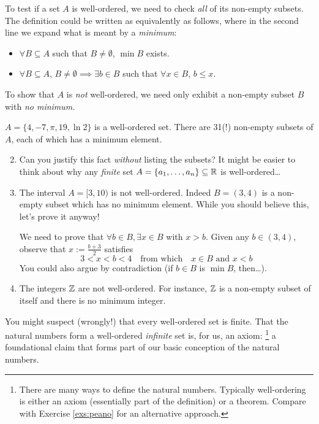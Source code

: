 To test if a set $A$ is well-ordered, we need to check \emph{all} of its non-empty subsets. The definition could be written as equivalently as follows, where in the second line we expand what is meant by a \emph{minimum}:
\begin{itemize}
  \item $\forall B\subseteq A$ such that $B\neq\emptyset$, $\min B$ exists.
  \item $\forall B\subseteq A$, $B\neq\emptyset\implies \exists b\in B$ such that $\forall x\in B$, $b\le x$.
\end{itemize}
To show that $A$ is \emph{not} well-ordered, we need only exhibit a non-empty subset $B$ with \emph{no minimum.}

\begin{examples}{}{}
	\exstart $A=\{4,-7,\pi,19,\ln 2\}$ is a well-ordered set. There are 31(!) non-empty subsets of $A$, each of which has a minimum element.\vspace{-5pt}
	\begin{enumerate}\setcounter{enumi}{1}
	  \item[] Can you justify this fact \emph{without} listing the subsets? It might be easier to think about why any \emph{finite} set $A=\{a_1,\ldots,a_n\}\subseteq\mathbb{R}$ is well-ordered\ldots 
	  
	  \item The interval $A=[3,10)$ is not well-ordered. Indeed $B=(3,4)$ is a non-empty subset which has no minimum element. While you should believe this, let's prove it anyway!\par
	  We need to prove that $\forall b\in B, \exists x\in B$ with $x>b$. Given any $b\in(3,4)$, observe that $x:=\frac{b+3}2$ satisfies
	  \[
	  	3<x<b<4 \quad\text{from which}\quad x\in B\text{ and }x<b
	  \]
	  You could also argue by contradiction (if $b\in B$ is $\min B$, then\ldots).
	  
	  \item The integers $\mathbb{Z}$ are not well-ordered. For instance, $\mathbb{Z}$ is a non-empty subset of itself and there is no minimum integer.
	\end{enumerate}
\end{examples}

You might suspect (wrongly!) that every well-ordered set is finite. That the natural numbers form a well-ordered \emph{infinite} set is, for us, an axiom:
\footnote{There are many ways to define the natural numbers. Typically well-ordering is either an axiom (essentially part of the definition) or a theorem. Compare with Exercise \ref{exs:peano} for an alternative approach.} a foundational claim that forms part of our basic conception of the natural numbers.

